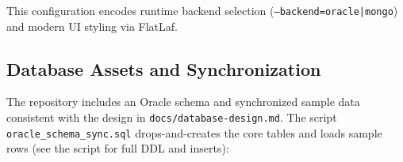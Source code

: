 \documentclass[12pt,a4paper]{article}
\newcommand{\code}[1]{\texttt{#1}}
\newcommand{\file}[1]{\texttt{#1}}
\begin{document}
\begin{comment}
\begin{lstlisting}[style=java, caption=Maven dependencies evidencing dual backend]
<dependencies>
  <!-- Oracle JDBC Driver -->
  <dependency>
    <groupId>com.oracle.database.jdbc</groupId>
    <artifactId>ojdbc8</artifactId>
    <version>21.7.0.0</version>
  </dependency>
  <!-- MongoDB Driver -->
  <dependency>
    <groupId>org.mongodb</groupId>
    <artifactId>mongodb-driver-sync</artifactId>
    <version>4.11.1</version>
  </dependency>
  <!-- Swing Look and Feel -->
  <dependency>
    <groupId>com.formdev</groupId>
    <artifactId>flatlaf</artifactId>
    <version>3.2.5</version>
  </dependency>
</dependencies>

<!-- Executable packaging (Launch4j): oracle and mongo variants -->
<plugin>
  <groupId>com.akathist.maven.plugins.launch4j</groupId>
  <artifactId>launch4j-maven-plugin</artifactId>
  <version>2.1.2</version>
  <executions>
    <execution>
      <id>oracle-exe</id>
      <phase>package</phase>
      <goals><goal>launch4j</goal></goals>
      <configuration>
        <outfile>${project.build.directory}/library_oracle.exe</outfile>
        <cmdLine>--backend=oracle</cmdLine>
      </configuration>
    </execution>
    <execution>
      <id>mongo-exe</id>
      <phase>package</phase>
      <goals><goal>launch4j</goal></goals>
      <configuration>
        <outfile>${project.build.directory}/library_mongo.exe</outfile>
        <cmdLine>--backend=mongo</cmdLine>
      </configuration>
    </execution>
  </executions>
</plugin>
\end{lstlisting}
\end{comment}

This configuration encodes runtime backend selection (\code{--backend=oracle|mongo}) and modern UI styling via FlatLaf.

\subsection{Database Assets and Synchronization}

The repository includes an Oracle schema and synchronized sample data consistent with the design in \file{docs/database-design.md}. The script \file{oracle\_schema\_sync.sql} drops-and-creates the core tables and loads sample rows (see the script for full DDL and inserts):
\end{document}
